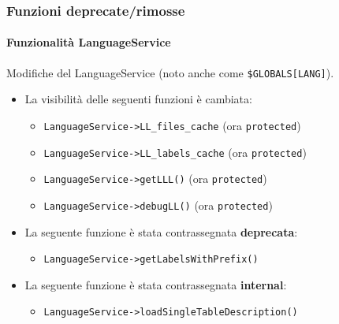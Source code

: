 \begin{frame}[fragile]
	\frametitle{Funzioni deprecate/rimosse}
	\framesubtitle{Funzionalità LanguageService}

	Modifiche del LanguageService (noto anche come \texttt{\$GLOBALS[LANG]}).
	\vspace{0.4cm}
	\begin{itemize}
		\item La visibilità delle seguenti funzioni è cambiata:
			\begin{itemize}\smaller
				\item \texttt{LanguageService->LL\_files\_cache} (ora \texttt{protected})
				\item \texttt{LanguageService->LL\_labels\_cache} (ora \texttt{protected})
				\item \texttt{LanguageService->getLLL()} (ora \texttt{protected})
				\item \texttt{LanguageService->debugLL()} (ora \texttt{protected})
			\end{itemize}\normalsize
			\vspace{0.2cm}

		\item La seguente funzione è stata contrassegnata \textbf{deprecata}:
			\begin{itemize}\smaller
				\item \texttt{LanguageService->getLabelsWithPrefix()}
			\end{itemize}\normalsize
			\vspace{0.2cm}

		\item La seguente funzione è stata contrassegnata \textbf{internal}:
			\begin{itemize}\smaller
				\item \texttt{LanguageService->loadSingleTableDescription()}
			\end{itemize}\normalsize
			\vspace{0.2cm}

	\end{itemize}

\end{frame}


